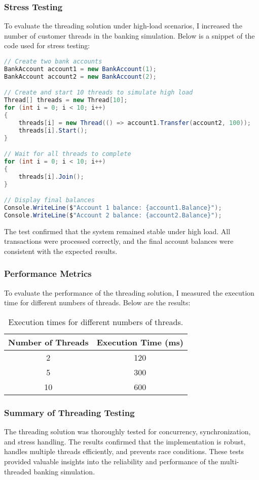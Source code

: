 \documentclass{article}
\begin{document}
\subsubsection*{Stress Testing}
To evaluate the threading solution under high-load scenarios, I increased the number of customer threads in the banking simulation. Below is a snippet of the code used for stress testing:

\begin{lstlisting}[language=C#]
// Create two bank accounts
BankAccount account1 = new BankAccount(1);
BankAccount account2 = new BankAccount(2);

// Create and start 10 threads to simulate high load
Thread[] threads = new Thread[10];
for (int i = 0; i < 10; i++)
{
    threads[i] = new Thread(() => account1.Transfer(account2, 100));
    threads[i].Start();
}

// Wait for all threads to complete
for (int i = 0; i < 10; i++)
{
    threads[i].Join();
}

// Display final balances
Console.WriteLine($"Account 1 balance: {account1.Balance}");
Console.WriteLine($"Account 2 balance: {account2.Balance}");
\end{lstlisting}

The test confirmed that the system remained stable under high load. All transactions were processed correctly, and the final account balances were consistent with the expected results.

\subsubsection*{Performance Metrics}
To evaluate the performance of the threading solution, I measured the execution time for different numbers of threads. Below are the results:

\begin{table}[h]
    \centering
    \begin{tabular}{|c|c|}
        \hline
        Number of Threads & Execution Time (ms) \\
        \hline
        2 & 120 \\
        5 & 300 \\
        10 & 600 \\
        \hline
    \end{tabular}
    \caption{Execution times for different numbers of threads.}
    \label{tab:thread_performance}
\end{table}

\subsubsection*{Summary of Threading Testing}
The threading solution was thoroughly tested for concurrency, synchronization, and stress handling. The results confirmed that the implementation is robust, handles multiple threads efficiently, and prevents race conditions. These tests provided valuable insights into the reliability and performance of the multi-threaded banking simulation.
\end{document}
